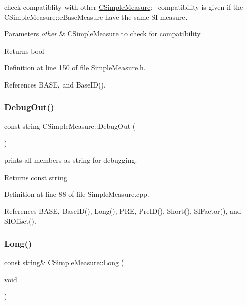 check compatiblity with other \hyperlink{classCSimpleMeasure}{C\+Simple\+Measure}\+:~\newline
 compatibility is given if the C\+Simple\+Measure\+::e\+Base\+Measure have the same SI measure. 


\begin{DoxyParams}{Parameters}
{\em other} & \hyperlink{classCSimpleMeasure}{C\+Simple\+Measure} to check for compatibility \\
\hline
\end{DoxyParams}
\begin{DoxyReturn}{Returns}
bool 
\end{DoxyReturn}


Definition at line 150 of file Simple\+Measure.\+h.



References B\+A\+SE, and Base\+I\+D().

\mbox{\label{classCSimpleMeasure_a1031ddc7887dce1a739f38abe03601da}} 
\subsubsection{\texorpdfstring{Debug\+Out()}{DebugOut()}}
{\footnotesize\ttfamily const string C\+Simple\+Measure\+::\+Debug\+Out (\begin{DoxyParamCaption}{ }\end{DoxyParamCaption})}



prints all members as string for debugging. 

\begin{DoxyReturn}{Returns}
const string 
\end{DoxyReturn}


Definition at line 88 of file Simple\+Measure.\+cpp.



References B\+A\+SE, Base\+I\+D(), Long(), P\+RE, Pre\+I\+D(), Short(), S\+I\+Factor(), and S\+I\+Offset().

\mbox{\label{classCSimpleMeasure_a62d318d474f4feb9b25e113f47dd45c6}} 
\subsubsection{\texorpdfstring{Long()}{Long()}}
{\footnotesize\ttfamily const string\& C\+Simple\+Measure\+::\+Long (\begin{DoxyParamCaption}\item[{void}]{ }\end{DoxyParamCaption})\hspace{0.3cm}{\ttfamily [inline]}}



